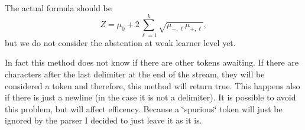 
\begin{DoxyRefList}
\item[\label{bug__bug000002}%
\hypertarget{bug__bug000002}{}%
Member \hyperlink{classMultiBoost_1_1AbstainableLearner_a04438bf3df3599fe42ca26771b6b2aff}{Multi\-Boost\-:\-:Abstainable\-Learner\-:\-:do\-Real\-Abstention} (const vector$<$ s\-Rates $>$ \&mu, const s\-Rates \&eps, Alpha\-Real \&alpha, vector$<$ Alpha\-Real $>$ \&v)]The actual formula should be \[ Z = \mu_0 + 2 \sum_{\ell=1}^k \sqrt{ \mu_{-,\ell} \mu_{+,\ell} }, \] but we do not consider the abstention at weak learner level yet.  
\item[\label{bug__bug000001}%
\hypertarget{bug__bug000001}{}%
Member \hyperlink{classnor__utils_1_1StreamTokenizer_a16acf21421cefcc3c45c54eb0ac8810e}{nor\-\_\-utils\-:\-:Stream\-Tokenizer\-:\-:has\-\_\-token} ()]In fact this method does not know if there are other tokens awaiting. If there are characters after the last delimiter at the end of the stream, they will be considered a token and therefore, this method will return true. This happens also if there is just a newline (in the case it is not a delimiter). It is possible to avoid this problem, but will affect efficency. Because a \char`\"{}spurious\char`\"{} token will just be ignored by the parser I decided to just leave it as it is. 
\end{DoxyRefList}